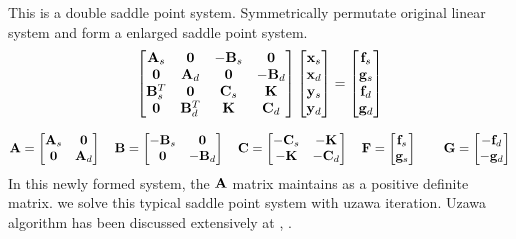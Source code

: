 This is a double saddle point system. 
Symmetrically permutate original linear system and form a enlarged saddle point system.
\begin{equation}
\begin{bmatrix}
\bold{A}_s   & \bold{0}     & -\bold{B}_s &  \bold{0}   \\
\bold{0}     & \bold{A}_d   &  \bold{0}   & -\bold{B}_d \\
\bold{B}_s^T & \bold{0}     &  \bold{C}_s &  \bold{K}   \\
\bold{0}     & \bold{B}_d^T &  \bold{K}   &  \bold{C}_d
\end{bmatrix} \begin{bmatrix}
\bold{x}_s\\
\bold{x}_d\\
\bold{y}_s\\
\bold{y}_d
\end{bmatrix}= 
\begin{bmatrix}
\bold{f}_s\\
\bold{g}_s\\
\bold{f}_d\\
\bold{g}_d
\end{bmatrix}
\end{equation}

\begin{equation}
\bold{A} = \begin{bmatrix}
\bold{A}_s   & \bold{0}    \\
\bold{0}     & \bold{A}_d  
\end{bmatrix}
\quad
\bold{B} = \begin{bmatrix}
-\bold{B}_s & \bold{0}   \\
\bold{0}   & -\bold{B}_d
\end{bmatrix}
\quad
\bold{C} = \begin{bmatrix}
- \bold{C}_s &  -\bold{K}   \\
- \bold{K}   &  -\bold{C}_d
\end{bmatrix}
\quad \bold{F} = \begin{bmatrix}
\bold{f}_s \\
\bold{g}_s
\end{bmatrix}
\quad
\quad \bold{G} = \begin{bmatrix}
-\bold{f}_d \\
-\bold{g}_d
\end{bmatrix}
\end{equation}
In this newly formed system, the $\bold{A}$ matrix maintains as a positive definite matrix.
we solve this typical saddle point system with uzawa iteration. Uzawa algorithm has been discussed
extensively at \cite{InexactUzawa_Elam_Golub}, \cite{AnalysisInexactUzawa_Bramble_Pasciak_Vassilev}.

